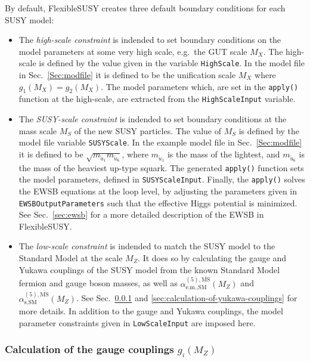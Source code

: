 \documentclass[final,3p,11pt,pdflatex]{elsarticle}
\makeatletter
\newcommand{\fs}{FlexibleSUSY\@\xspace}
\newcommand{\code}[1]{\lstinline|#1|}  %
\newcommand{\textoverline}[1]{$\overline{\mbox{#1}}$}
\newcommand{\MSbar}{\textoverline{MS}\xspace}
\newcommand{\secref}[1]{Sec.~\ref{#1}}
\makeatother
\begin{document}
By default, \fs creates three default boundary conditions for each
SUSY model:
%
\begin{itemize}
\item The \emph{high-scale constraint} is indended to set boundary
  conditions on the model parameters at some very high scale, e.g.\
  the GUT scale $M_X$.  The high-scale is defined by the value given
  in the variable \code{HighScale}.  In the model file in
  \secref{Sec:modfile} it is defined to be the unification scale $M_X$
  where $g_1(M_X) = g_2(M_X)$.  The model parameters which, are set in
  the \code{apply()} function at the high-scale, are extracted from the
  \code{HighScaleInput} variable.

\item The \emph{SUSY-scale constraint} is indended to set boundary
  conditions at the mass scale $M_S$ of the new SUSY particles.  The
  value of $M_S$ is defined by the model file variable
  \code{SUSYScale}.  In the example model file in \secref{Sec:modfile}
  it is defined to be $\sqrt{m_{\tilde{u}_1} m_{\tilde{u}_6}}$, where
  $m_{\tilde{u}_1}$ is the mass of the lightest, and $m_{\tilde{u}_6}$
  is the mass of the heaviest up-type squark.  The generated
  \code{apply()} function sets the model parameters, defined in
  \code{SUSYScaleInput}.  Finally, the \code{apply()} solves the EWSB
  equations at the loop level, by adjusting the parameters given in
  \code{EWSBOutputParameters} such that the effective Higgs potential
  is minimized.  See \secref{sec:ewsb} for a more detailed description
  of the EWSB in \fs.

\item The \emph{low-scale constraint} is indended to match the SUSY
  model to the Standard Model at the scale $M_Z$.  It does so by
  calculating the gauge and Yukawa couplings of the SUSY model from
  the known Standard Model fermion and gauge boson masses, as well as
  $\alpha_{\text{e.m.},\text{SM}}^{(5),\text{\MSbar}}(M_Z)$ and
  $\alpha_{\text{s},\text{SM}}^{(5),\text{\MSbar}}(M_Z)$.  See
  \secref{sec:calculation-of-gauge-couplings} and
  \ref{sec:calculation-of-yukawa-couplings} for more details.  In
  addition to the gauge and Yukawa couplings, the model parameter
  constraints given in \code{LowScaleInput} are imposed here.
\end{itemize}

\subsubsection{Calculation of the gauge couplings $g_i(M_Z)$}
\label{sec:calculation-of-gauge-couplings}
\end{document}
